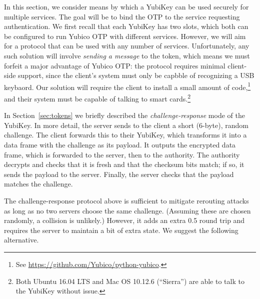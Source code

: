 \label{sec:otp1}
In this section, we consider means by which a YubiKey can be used securely for
multiple services. The goal will be to bind the OTP to the service requesting
authentication.
%
We first recall that each YubiKey has two slots, which both can be configured to
run Yubico OTP with different services. However, we will aim for a protocol that
can be used with any number of services.
%
Unfortunately, any such solution will involve \emph{sending a message} to the
token, which means we must forfeit a major advantage of Yubico OTP: the protocol
requires minimal client-side support, since the client's system must only be
capbble of recognizing a USB keybaord. Our solution will require the client to
install a small amount of code,\footnote{See
\url{https://github.com/Yubico/python-yubico}.} and their system must be capable
of talking to smart cards.\footnote{Both Ubuntu 16.04 LTS and Mac OS 10.12.6
(``Sierra'') are able to talk to the YubiKey without issue.}

In Section~\ref{sec:tokens} we briefly described the \emph{challenge-response}
mode of the YubiKey. In more detail, the server sends to the client a short
(6-byte), random challenge. The client forwards this to their YubiKey, which
transforms it into a data frame with the challenge as its payload. It outputs
the encrypted data frame, which is forwarded to the server, then to the
authority. The authority decrypts and checks that it is fresh and that the
checksum bits match; if so, it sends the payload to the server. Finally, the
server checks that the payload matches the challenge.

\newcommand{\hash}{\schemefont{hash}}
The challenge-response protocol above is sufficient to mitigate rerouting
attacks as long as no two servers choose the same challenge. (Assuming these are
chosen randomly, a collision is unlikely.) However, it adds an extra 0.5 round
trip and requires the server to maintain a bit of extra state.
%
We suggest the following alternative.

